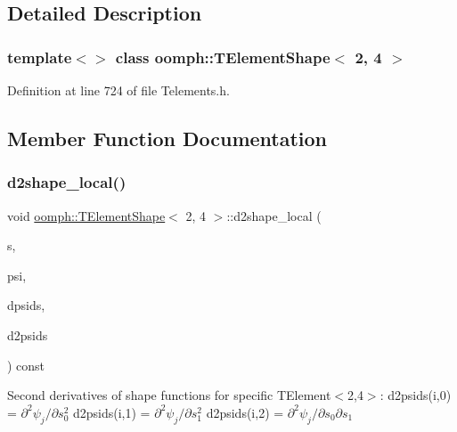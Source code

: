 \subsection{Detailed Description}
\subsubsection*{template$<$$>$\newline
class oomph\+::\+T\+Element\+Shape$<$ 2, 4 $>$}



Definition at line 724 of file Telements.\+h.



\subsection{Member Function Documentation}
\mbox{\label{classoomph_1_1TElementShape_3_012_00_014_01_4_ad45219b60de75743d5f4e5154ab2c05e}} 
\subsubsection{\texorpdfstring{d2shape\+\_\+local()}{d2shape\_local()}}
{\footnotesize\ttfamily void \hyperlink{classoomph_1_1TElementShape}{oomph\+::\+T\+Element\+Shape}$<$ 2, 4 $>$\+::d2shape\+\_\+local (\begin{DoxyParamCaption}\item[{const \hyperlink{classoomph_1_1Vector}{Vector}$<$ double $>$ \&}]{s,  }\item[{\hyperlink{classoomph_1_1Shape}{Shape} \&}]{psi,  }\item[{\hyperlink{classoomph_1_1DShape}{D\+Shape} \&}]{dpsids,  }\item[{\hyperlink{classoomph_1_1DShape}{D\+Shape} \&}]{d2psids }\end{DoxyParamCaption}) const\hspace{0.3cm}{\ttfamily [inline]}}

Second derivatives of shape functions for specific T\+Element$<$2,4$>$\+: d2psids(i,0) = $ \partial^2 \psi_j / \partial s_0^2 $ d2psids(i,1) = $ \partial^2 \psi_j / \partial s_1^2 $ d2psids(i,2) = $ \partial^2 \psi_j / \partial s_0 \partial s_1 $ 

